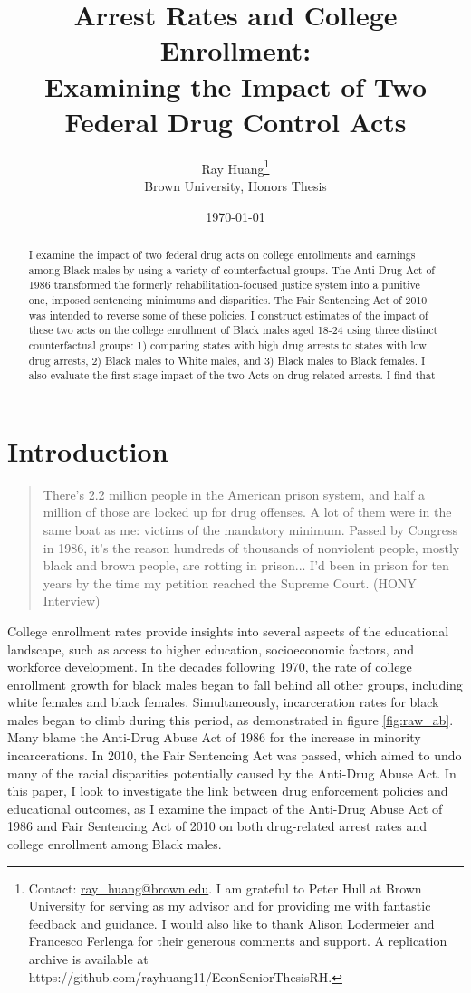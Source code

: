 \documentclass{article}
\title{Arrest Rates and College Enrollment:
\texorpdfstring{\\}{} Examining the Impact of Two Federal Drug Control Acts}
\author{Ray Huang\thanks{Contact:
    \href{mailto:ray_huang@brown.edu}{ray\_huang@brown.edu}.
     I am grateful to Peter Hull at Brown University for serving as my advisor and for providing me with fantastic feedback and guidance. I would also like to thank Alison Lodermeier and Francesco Ferlenga for their generous comments and support. A replication archive is available at https://github.com/rayhuang11/EconSeniorThesisRH.}
     \\Brown University, Honors Thesis}
\date{\today}
\begin{document}
\maketitle

\begin{abstract}
\noindent I examine the impact of two federal drug acts on college enrollments and earnings among Black males by using a variety of counterfactual groups. The Anti-Drug Act of 1986 transformed the formerly rehabilitation-focused justice system into a punitive one, imposed sentencing minimums and disparities. The Fair Sentencing Act of 2010 was intended to reverse some of these policies. I construct estimates of the impact of these two acts on the college enrollment of Black males aged 18-24 using three distinct counterfactual groups: 1) comparing states with high drug arrests to states with low drug arrests, 2) Black males to White males, and 3) Black males to Black females. I also evaluate the first stage impact of the two Acts on drug-related arrests. I find that

\end{abstract}

\clearpage

\section{Introduction}
 

\begin{quote}
  There’s 2.2 million people in the American prison system, and half a million of those are locked up for drug offenses. A lot of them were in the same boat as me: victims of the mandatory minimum. Passed by Congress in 1986, it’s the reason hundreds of thousands of nonviolent people, mostly black and brown people, are rotting in prison... I’d been in prison for ten years by the time my petition reached the Supreme Court. (HONY Interview)
\end{quote}

College enrollment rates provide insights into several aspects of the educational landscape, such as access to higher education, socioeconomic factors, and workforce development. In the decades following 1970, the rate of college enrollment growth for black males began to fall behind all other groups, including white females and black females. Simultaneously, incarceration rates for black males began to climb during this period, as demonstrated in figure \ref{fig:raw_ab}. Many blame the Anti-Drug Abuse Act of 1986 for the increase in minority incarcerations. In 2010, the Fair Sentencing Act was passed, which aimed to undo many of the racial disparities potentially caused by the Anti-Drug Abuse Act. In this paper, I look to investigate the link between drug enforcement policies and educational outcomes, as I examine the impact of the Anti-Drug Abuse Act of 1986 and Fair Sentencing Act of 2010 on both drug-related arrest rates and college enrollment among Black males.
\end{document}

